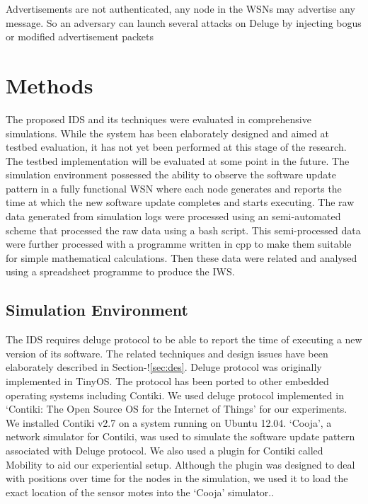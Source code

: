 \documentclass[conference,final]{IEEEtran}
\begin{document}
Advertisements are not authenticated, any node in the WSNs may advertise any message. So an adversary can 
launch several attacks on Deluge by injecting bogus or modified advertisement packets 




\section{Methods}
\label{sec:meth}

The proposed IDS and its techniques were evaluated in comprehensive simulations.
While the system has been elaborately designed and aimed at testbed evaluation, it has not yet been performed at this stage of the research. 
The testbed implementation will be evaluated at some point in the future.
The simulation environment possessed the ability to observe the software update pattern in a fully functional WSN where each node generates and reports the time at which the new software update completes and starts executing.
The raw data generated from simulation logs were processed using an semi-automated scheme that processed the raw data using a bash script.
This semi-processed data were further processed with a programme written in cpp to make them suitable for simple mathematical calculations.
Then these data were related and  analysed using a spreadsheet programme to produce the IWS.


\subsection*{Simulation Environment}
\label{subsec:sim_env}
The IDS requires deluge protocol to be able to report the time of executing  a new version of its software.
The related techniques and design issues have been elaborately described in Section-!\ref{sec:des}.
Deluge protocol was originally implemented in TinyOS.
The protocol has been ported to other embedded operating systems including Contiki.
We used deluge protocol implemented in `Contiki: The Open Source OS for the Internet of Things' for our experiments. 
We installed Contiki v2.7 on a system running on Ubuntu 12.04.
`Cooja', a network simulator for Contiki, was used to simulate the software update pattern associated with Deluge protocol. 
We also used a plugin for Contiki called Mobility to aid our experiential setup.
Although the plugin was designed to deal with positions over time for the nodes in the simulation, we used it to load the exact location of the sensor motes into the `Cooja' simulator.. 
\end{document}
